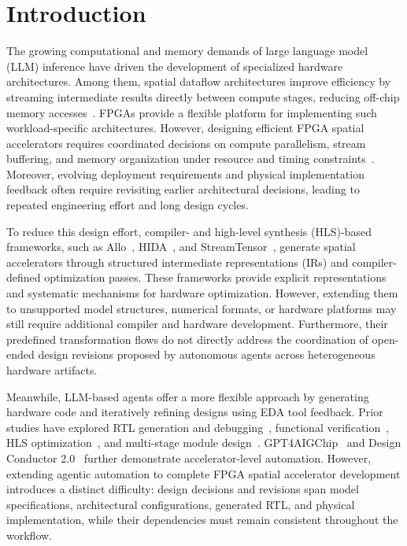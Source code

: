 \section{Introduction}

The growing computational and memory demands of large language model (LLM) inference have driven the development of specialized hardware architectures. Among them, spatial dataflow architectures improve efficiency by streaming intermediate results directly between compute stages, reducing off-chip memory accesses~\cite{streamtensor}. FPGAs provide a flexible platform for implementing such workload-specific architectures. However, designing efficient FPGA spatial accelerators requires coordinated decisions on compute parallelism, stream buffering, and memory organization under resource and timing constraints~\cite{allo,streamtensor}. Moreover, evolving deployment requirements and physical implementation feedback often require revisiting earlier architectural decisions, leading to repeated engineering effort and long design cycles.

To reduce this design effort, compiler- and high-level synthesis (HLS)-based frameworks, such as Allo~\cite{allo}, HIDA~\cite{hida}, and StreamTensor~\cite{streamtensor}, generate spatial accelerators through structured intermediate representations (IRs) and compiler-defined optimization passes. These frameworks provide explicit representations and systematic mechanisms for hardware optimization. However, extending them to unsupported model structures, numerical formats, or hardware platforms may still require additional compiler and hardware development. Furthermore, their predefined transformation flows do not directly address the coordination of open-ended design revisions proposed by autonomous agents across heterogeneous hardware artifacts.

Meanwhile, LLM-based agents offer a more flexible approach by generating hardware code and iteratively refining designs using EDA tool feedback. Prior studies have explored RTL generation and debugging~\cite{mage,rtlfixer}, functional verification~\cite{assertllm,correctbench}, HLS optimization~\cite{hlspilot}, and multi-stage module design~\cite{mahl}. GPT4AIGChip~\cite{gpt4aigchip} and Design Conductor 2.0~\cite{designconductor2} further demonstrate accelerator-level automation. However, extending agentic automation to complete FPGA spatial accelerator development introduces a distinct difficulty: design decisions and revisions span model specifications, architectural configurations, generated RTL, and physical implementation, while their dependencies must remain consistent throughout the workflow.

